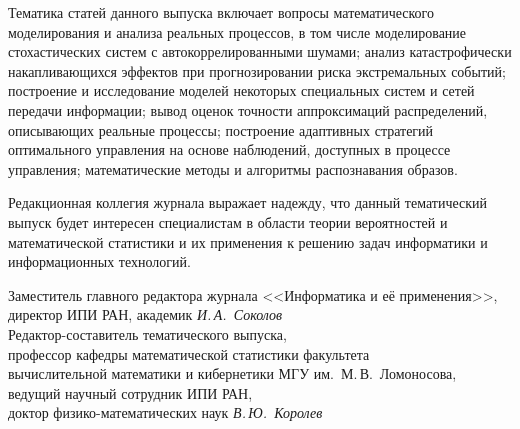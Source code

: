 {{{      Тематика статей данного выпуска включает вопросы математического 
моделирования и анализа реальных процессов, в том числе моделирование  
стохастических систем с автокоррелированными шумами; анализ катастрофически 
накапливающихся эффектов при прогнозировании риска экстремальных событий; 
построение и исследование моделей некоторых специальных систем и сетей передачи 
информации; вывод оценок точности аппроксимаций распределений, описывающих 
реальные процессы; построение адаптивных стратегий оптимального управления на 
основе наблюдений, доступных в процессе управления; математические методы и 
алгоритмы распознавания образов. 
      
      Редакционная коллегия журнала выражает надежду, что данный тематический  
выпуск будет интересен специалистам в области теории вероятностей и математической 
статистики и их применения к решению задач информатики и информационных 
технологий.
      
           \vspace*{20mm}
           \noindent
           Заместитель главного редактора журнала <<Информатика и её 
      применения>>,\\
           директор ИПИ РАН, академик  \hfill
           \textit{И.\,А.~Соколов}\\
           
           \noindent
           Редактор-составитель тематического выпуска,\\
           профессор кафедры математической статистики факультета\\
            вычислительной математики и кибернетики МГУ им.\ М.\,В.~Ломоносова,\\
           ведущий научный сотрудник ИПИ РАН,\\ 
      доктор физико-математических наук \hfill
            \textit{В.\,Ю.~Королев}
           
           } }
           }